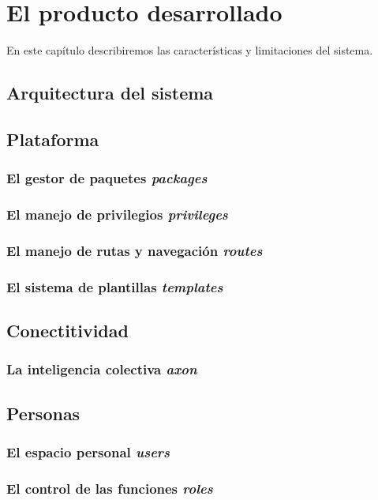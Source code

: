 \chapter{El producto desarrollado}

En este capítulo describiremos las características y limitaciones del sistema.

\section{Arquitectura del sistema}

\section{Plataforma}
\subsection{El gestor de paquetes \emph{packages}}
\subsection{El manejo de privilegios \emph{privileges}}
\subsection{El manejo de rutas y navegación \emph{routes}}
\subsection{El sistema de plantillas \emph{templates}}

\section{Conectitividad}
\subsection{La inteligencia colectiva \emph{axon}}

\section{Personas}
\subsection{El espacio personal \emph{users}}
\subsection{El control de las funciones \emph{roles}}

